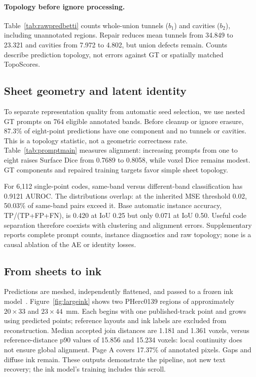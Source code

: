 \paragraph{Topology before ignore processing.}
Table~\ref{tab:rawpredbetti} counts whole-union tunnels ($b_1$) and cavities
($b_2$), including unannotated regions. Repair reduces mean tunnels from
34.849 to 23.321 and cavities from 7.972 to 4.802, but union defects remain. Counts describe
prediction topology, not errors against GT or spatially matched TopoScores.



\subsection{Sheet geometry and latent identity}
To separate representation quality from automatic seed selection, we use
nested GT prompts on 764 eligible annotated bands. Before cleanup or ignore
erasure, 87.3\% of eight-point predictions have one component and no tunnels
or cavities. This is a topology statistic, not a geometric correctness rate.
Table~\ref{tab:promptmain} measures alignment: increasing prompts from one to
eight raises Surface Dice from 0.7689 to 0.8058, while voxel Dice remains modest.
GT components and repaired training targets favor simple sheet topology.



For 6,112 single-point codes, same-band versus different-band classification
has 0.9121 AUROC. The distributions overlap: at the inherited MSE threshold
0.02, 50.03\% of same-band pairs exceed it. Base automatic instance accuracy,
TP/(TP+FP+FN), is 0.420 at IoU 0.25 but only 0.071 at IoU 0.50.
Useful code separation therefore coexists with clustering and alignment errors.
Supplementary reports complete prompt counts, instance diagnostics and raw
topology; none is a causal ablation of the AE or identity losses.

\subsection{From sheets to ink}
Predictions are meshed, independently flattened, and passed to a frozen ink
model~\cite{scrollfiesta,rabinovich2017slim,scrollprizeink}.
Figure~\ref{fig:largeink} shows two PHerc0139 regions of approximately
$20\times33$ and $23\times44$~mm. Each begins with one published-track point
and grows using predicted points; reference layouts and ink labels are
excluded from reconstruction. Median accepted join distances are 1.181 and
1.361 voxels, versus reference-distance p90 values of 15.856 and 15.234 voxels:
local continuity does not ensure global alignment. Page A covers 17.37\% of
annotated pixels. Gaps and diffuse ink remain. These outputs demonstrate the
pipeline, not new text recovery; the ink model's training includes this scroll.
